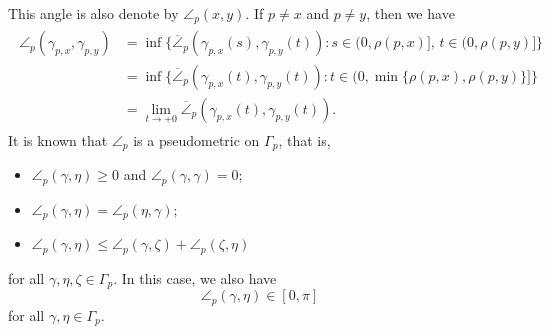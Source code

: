 \documentclass[draft]{amsart}
\numberwithin{equation}{section}
\theoremstyle{plain}
\theoremstyle{definition}
\theoremstyle{remark}
\begin{document}
This angle is also denote by $\angle_p(x, y)$. 
If $p\neq x$ and $p\neq y$, then we have 
\begin{align}
 \begin{split}\label{eq:ineq-Alex}
   \angle_p(\gamma_{p,x}, \gamma_{p,y}) 
 &=\inf  
 \bigl\{\overline{\angle}_p\left(\gamma_{p,x}(s), \gamma_{p,y}(t)\right): 
 s\in (0,\rho(p,x)], \, t\in (0,\rho(p,y)]\bigr\} \\
 &=\inf 
 \bigl\{\overline{\angle}_p\left(\gamma_{p,x}(t), \gamma_{p,y}(t)\right): 
 t\in (0,\min \{\rho(p,x), \rho(p,y)\}]\bigr\} \\
 &=\lim_{t\rightarrow +0} 
 \overline{\angle}_p\left(\gamma_{p,x}(t), \gamma_{p,y}(t)\right). 
 \end{split}
\end{align}
It is known that $\angle_p$ is a pseudometric on $\Gamma_p$, that is, 
\begin{itemize}
 \item $\angle_p(\gamma, \eta)\geq 0$ and $\angle_p(\gamma, \gamma)=0$; 
 \item $\angle_p(\gamma, \eta)=\angle_p(\eta, \gamma)$; 
 \item $\angle_p(\gamma, \eta)\leq \angle_p(\gamma, \zeta)+\angle_p(\zeta, \eta)$
\end{itemize}
for all $\gamma, \eta, \zeta \in \Gamma_p$. 
In this case, we also have 
\[
 \angle_p(\gamma, \eta)\in [0,\pi]
\]
for all $\gamma, \eta \in \Gamma_p$. 
\end{document}
